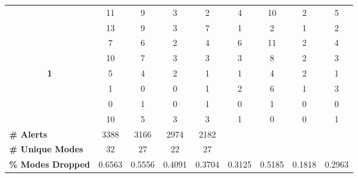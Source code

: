 \begin{table}[!htbp]
\begin{adjustbox}{angle=90}
\begin{tabular}{ccccccccc}
			\multicolumn{1}{c|}{} & \multicolumn{1}{c|}{11} & \multicolumn{1}{c|}{9} & \multicolumn{1}{c|}{3} & \multicolumn{1}{c|}{2} & \multicolumn{1}{c|}{4} & \multicolumn{1}{c|}{10} & \multicolumn{1}{c|}{2} & 5 \\
			\multicolumn{1}{c|}{} & \multicolumn{1}{c|}{13} & \multicolumn{1}{c|}{9} & \multicolumn{1}{c|}{3} & \multicolumn{1}{c|}{7} & \multicolumn{1}{c|}{1} & \multicolumn{1}{c|}{2} & \multicolumn{1}{c|}{1} & 2 \\
			\multicolumn{1}{c|}{} & \multicolumn{1}{c|}{7} & \multicolumn{1}{c|}{6} & \multicolumn{1}{c|}{2} & \multicolumn{1}{c|}{4} & \multicolumn{1}{c|}{6} & \multicolumn{1}{c|}{11} & \multicolumn{1}{c|}{2} & 4 \\
			\multicolumn{1}{c|}{} & \multicolumn{1}{c|}{10} & \multicolumn{1}{c|}{7} & \multicolumn{1}{c|}{3} & \multicolumn{1}{c|}{3} & \multicolumn{1}{c|}{3} & \multicolumn{1}{c|}{8} & \multicolumn{1}{c|}{2} & 3 \\ \hline
			\multicolumn{1}{c|}{\multirow{4}{*}{\textbf{1}}} & \multicolumn{1}{c|}{5} & \multicolumn{1}{c|}{4} & \multicolumn{1}{c|}{2} & \multicolumn{1}{c|}{1} & \multicolumn{1}{c|}{1} & \multicolumn{1}{c|}{4} & \multicolumn{1}{c|}{2} & 1 \\
			\multicolumn{1}{c|}{} & \multicolumn{1}{c|}{1} & \multicolumn{1}{c|}{0} & \multicolumn{1}{c|}{0} & \multicolumn{1}{c|}{1} & \multicolumn{1}{c|}{2} & \multicolumn{1}{c|}{6} & \multicolumn{1}{c|}{1} & 3 \\
			\multicolumn{1}{c|}{} & \multicolumn{1}{c|}{0} & \multicolumn{1}{c|}{1} & \multicolumn{1}{c|}{0} & \multicolumn{1}{c|}{1} & \multicolumn{1}{c|}{0} & \multicolumn{1}{c|}{1} & \multicolumn{1}{c|}{0} & 0 \\
			\multicolumn{1}{c|}{} & \multicolumn{1}{c|}{10} & \multicolumn{1}{c|}{5} & \multicolumn{1}{c|}{3} & \multicolumn{1}{c|}{3} & \multicolumn{1}{c|}{1} & \multicolumn{1}{c|}{0} & \multicolumn{1}{c|}{0} & 1 \\ \hline
			\multicolumn{1}{l|}{\textbf{\# Alerts}} & \multicolumn{1}{c|}{3388} & \multicolumn{1}{c|}{3166} & \multicolumn{1}{c|}{2974} & \multicolumn{1}{c|}{2182} & \multicolumn{1}{l|}{} & \multicolumn{1}{l|}{} & \multicolumn{1}{l|}{} & \multicolumn{1}{l}{} \\
			\multicolumn{1}{l|}{\textbf{\# Unique Modes}} & \multicolumn{1}{c|}{32} & \multicolumn{1}{c|}{27} & \multicolumn{1}{c|}{22} & \multicolumn{1}{c|}{27} & \multicolumn{1}{l|}{} & \multicolumn{1}{l|}{} & \multicolumn{1}{l|}{} & \multicolumn{1}{l}{} \\
			\multicolumn{1}{l|}{\textbf{\% Modes Dropped}} & \multicolumn{1}{c|}{0.6563} & \multicolumn{1}{c|}{0.5556} & \multicolumn{1}{c|}{0.4091} & \multicolumn{1}{c|}{0.3704} & \multicolumn{1}{c|}{0.3125} & \multicolumn{1}{c|}{0.5185} & \multicolumn{1}{c|}{0.1818} & \multicolumn{1}{c}{0.2963}
		\end{tabular}
	\end{adjustbox}
\end{table}

